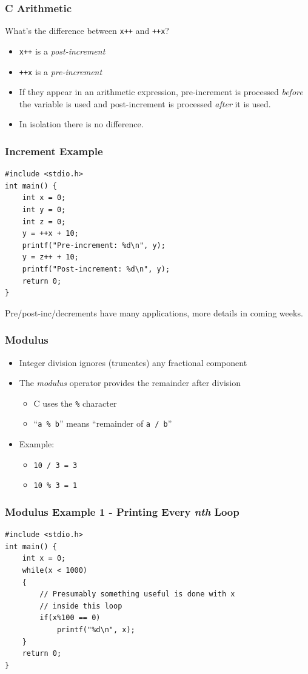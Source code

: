 \documentclass[14pt]{beamer}
\begin{document}
\begin{frame}
\frametitle{C Arithmetic}
What's the difference between \texttt{x++} and \texttt{++x}?
\begin{itemize}
\item \texttt{x++} is a \textit{post-increment}
\item \texttt{++x} is a \textit{pre-increment}
\item If they appear in an arithmetic expression, pre-increment is processed \textit{before} the variable is used and post-increment is processed \textit{after} it is used.
\item In isolation there is no difference.
\end{itemize}
\end{frame}

\begin{frame}[fragile]
\frametitle{Increment Example}
\begin{lstlisting}[style=CStyle,caption=\texttt{increment.c}]
#include <stdio.h>
int main() {
	int x = 0;
	int y = 0;
	int z = 0;
	y = ++x + 10;
	printf("Pre-increment: %d\n", y);
	y = z++ + 10;
	printf("Post-increment: %d\n", y);
	return 0;
}
\end{lstlisting}
Pre/post-inc/decrements have many applications, more details in coming weeks.
\end{frame}

\begin{frame}
\frametitle{Modulus}
\begin{itemize}
\item Integer division ignores (truncates) any fractional component
\item The \textit{modulus} operator provides the remainder after division
\begin{itemize}
	\item C uses the \texttt{\%} character
	\item ``\texttt{a \% b}'' means ``remainder of \texttt{a / b}''
\end{itemize}
\item Example:
	\begin{itemize}	
		\item \texttt{10 / 3 = 3}
		\item \texttt{10 \% 3 = 1}
	\end{itemize}
\end{itemize}
\end{frame}

\begin{frame}[fragile]
\frametitle{Modulus Example 1 - Printing Every \textit{nth} Loop}
\begin{lstlisting}[style=CStyle,caption=\texttt{loopmod.c}]
#include <stdio.h>
int main() {
	int x = 0;
	while(x < 1000)
	{
		// Presumably something useful is done with x
		// inside this loop
		if(x%100 == 0)
			printf("%d\n", x);
	}
	return 0;
}
\end{lstlisting}
\end{frame}
\end{document}
